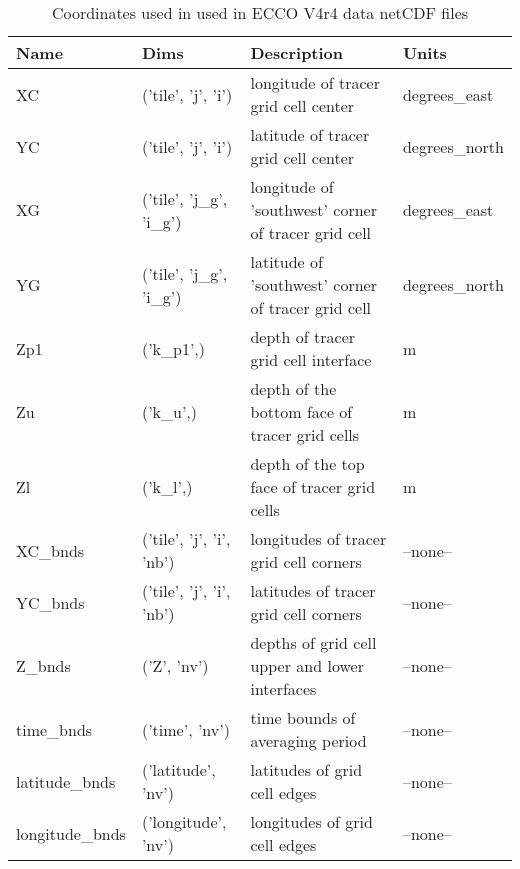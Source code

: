 \begin{longtable}{|p{}|p{}|p{}|p{}|}
\caption{Coordinates used in used in ECCO V4r4 data netCDF files}
\label{tab:variable-attributes} \\ 
\hline \endhead
\hline \endfoot
\rowcolor{blue!25} \textbf{Name} & \textbf{Dims} & \textbf{Description} & \textbf{Units} \\ \hline
\rowcolor{magenta!25}
XC & ('tile', 'j', 'i') & longitude of tracer grid cell center & degrees\_east \\ \hline
\rowcolor{magenta!25}
YC & ('tile', 'j', 'i') & latitude of tracer grid cell center & degrees\_north \\ \hline
\rowcolor{magenta!25}
XG & ('tile', 'j\_g', 'i\_g') & longitude of 'southwest' corner of tracer grid cell & degrees\_east \\ \hline
\rowcolor{magenta!25}
YG & ('tile', 'j\_g', 'i\_g') & latitude of 'southwest' corner of tracer grid cell & degrees\_north \\ \hline
\rowcolor{magenta!25}
Zp1 & ('k\_p1',) & depth of tracer grid cell interface & m \\ \hline
\rowcolor{magenta!25}
Zu & ('k\_u',) & depth of the bottom face of tracer grid cells & m \\ \hline
\rowcolor{magenta!25}
Zl & ('k\_l',) & depth of the top face of tracer grid cells & m \\ \hline
\rowcolor{magenta!25}
XC\_bnds & ('tile', 'j', 'i', 'nb') & longitudes of tracer grid cell corners & --none-- \\ \hline
\rowcolor{magenta!25}
YC\_bnds & ('tile', 'j', 'i', 'nb') & latitudes of tracer grid cell corners & --none-- \\ \hline
\rowcolor{magenta!25}
Z\_bnds & ('Z', 'nv') & depths of grid cell upper and lower interfaces & --none-- \\ \hline
\rowcolor{magenta!25}
time\_bnds & ('time', 'nv') & time bounds of averaging period & --none-- \\ \hline
\rowcolor{magenta!25}
latitude\_bnds & ('latitude', 'nv') & latitudes of grid cell edges & --none-- \\ \hline
\rowcolor{magenta!25}
longitude\_bnds & ('longitude', 'nv') & longitudes of grid cell edges & --none-- \\ \hline
\end{longtable}
